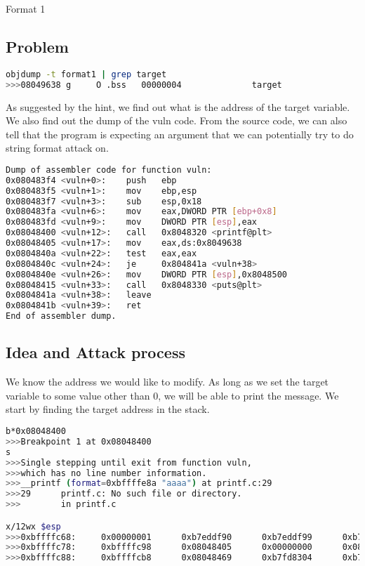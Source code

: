 
\begin{center}\begin{LARGE}Format 1\end{LARGE}\end{center}
 
\subsection*{Problem}

\begin{lstlisting}[language=bash]
objdump -t format1 | grep target
>>>08049638 g     O .bss   00000004              target
\end{lstlisting}

As suggested by the hint, we find out what is the address of the target variable.
We also find out the dump of the vuln code. From the source code, we can also tell
that the program is expecting an argument that we can potentially try to do string
format attack on.

\begin{lstlisting}[language=bash]
Dump of assembler code for function vuln:
0x080483f4 <vuln+0>:    push   ebp
0x080483f5 <vuln+1>:    mov    ebp,esp
0x080483f7 <vuln+3>:    sub    esp,0x18
0x080483fa <vuln+6>:    mov    eax,DWORD PTR [ebp+0x8]
0x080483fd <vuln+9>:    mov    DWORD PTR [esp],eax
0x08048400 <vuln+12>:   call   0x8048320 <printf@plt>
0x08048405 <vuln+17>:   mov    eax,ds:0x8049638
0x0804840a <vuln+22>:   test   eax,eax
0x0804840c <vuln+24>:   je     0x804841a <vuln+38>
0x0804840e <vuln+26>:   mov    DWORD PTR [esp],0x8048500
0x08048415 <vuln+33>:   call   0x8048330 <puts@plt>
0x0804841a <vuln+38>:   leave
0x0804841b <vuln+39>:   ret
End of assembler dump.
\end{lstlisting}


\subsection*{Idea and Attack process}

We know the address we would like to modify. As long as we set the target variable
to some value other than 0, we will be able to print the message. We start by finding
the target address in the stack.

\begin{lstlisting}[language=bash]
b*0x08048400
>>>Breakpoint 1 at 0x08048400
s
>>>Single stepping until exit from function vuln,
>>>which has no line number information.
>>>__printf (format=0xbffffe8a "aaaa") at printf.c:29
>>>29      printf.c: No such file or directory.
>>>        in printf.c

x/12wx $esp
>>>0xbffffc68:     0x00000001      0xb7eddf90      0xb7eddf99      0xb7fd7ff4
>>>0xbffffc78:     0xbffffc98      0x08048405      0x00000000      0x0804960c
>>>0xbffffc88:     0xbffffcb8      0x08048469      0xb7fd8304      0xb7fd7ff4
\end{lstlisting}

